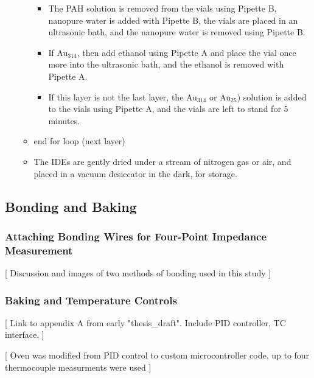 \documentclass[12pt,oneside,english]{article}
\begin{document}
\begin{itemize}
\begin{itemize}
\begin{itemize}
				\item The PAH solution is removed from the vials using Pipette B,  nanopure water is added with Pipette B, the vials are placed in an ultrasonic bath, and the nanopure water is removed using Pipette B.
				\item If Au$_{314}$, then add ethanol using Pipette A and place the vial once more into the ultrasonic bath, and the ethanol is removed with Pipette A.
				\item If this layer is not the last layer, the Au$_{314}$ or Au$_{25}$) solution is added to the vials using Pipette A, and the vials are left to stand for 5 minutes.
			\end{itemize}
			\item end for loop (next layer)
			\item The IDEs are gently dried under a stream of nitrogen gas or air, and placed in a vacuum desiccator in the dark, for storage.
		\end{itemize}
	\end{itemize}

	\subsection{Bonding and Baking}
	
	\subsubsection{Attaching Bonding Wires for Four-Point Impedance Measurement}
	[ Discussion and images of two methods of bonding used in this study ]
	
	\subsubsection{Baking and Temperature Controls}
	
	[ Link to appendix A from early "thesis\_draft".  Include PID controller, TC interface. ]
	
	[ Oven was modified from PID control to custom microcontroller code, up to four thermocouple measurments were used ]

	
\end{document}

